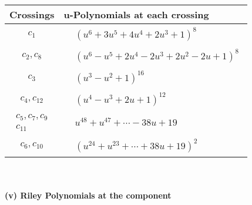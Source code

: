 \documentclass[1p]{elsarticle_modified}
\theoremstyle{definition}
\begin{document}
\begin{tabular}{m{50pt}|m{274pt}}
Crossings & \hspace{64pt}u-Polynomials at each crossing \\
\hline $$\begin{aligned}c_{1}\end{aligned}$$&$\begin{aligned}
&(u^6+3 u^5+4 u^4+2 u^3+1)^8
\end{aligned}$\\
\hline $$\begin{aligned}c_{2},c_{8}\end{aligned}$$&$\begin{aligned}
&(u^6- u^5+2 u^4-2 u^3+2 u^2-2 u+1)^8
\end{aligned}$\\
\hline $$\begin{aligned}c_{3}\end{aligned}$$&$\begin{aligned}
&(u^3- u^2+1)^{16}
\end{aligned}$\\
\hline $$\begin{aligned}c_{4},c_{12}\end{aligned}$$&$\begin{aligned}
&(u^4- u^3+2 u+1)^{12}
\end{aligned}$\\
\hline $$\begin{aligned}c_{5},c_{7},c_{9}\\c_{11}\end{aligned}$$&$\begin{aligned}
&u^{48}+u^{47}+\cdots-38 u+19
\end{aligned}$\\
\hline $$\begin{aligned}c_{6},c_{10}\end{aligned}$$&$\begin{aligned}
&(u^{24}+u^{23}+\cdots+38 u+19)^{2}
\end{aligned}$\\
\hline
\end{tabular}\\~\\
\newpage\renewcommand{\arraystretch}{1}
\flushleft \textbf{(v) Riley Polynomials at the component}\newline \\
\end{document}
